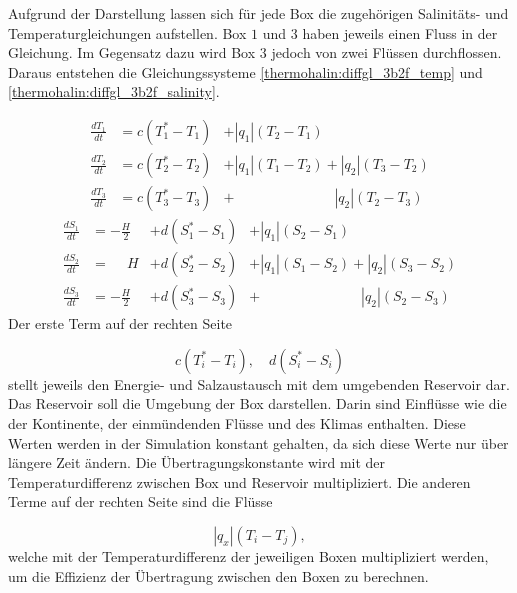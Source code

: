 Aufgrund der Darstellung lassen sich für jede Box die zugehörigen Salinitäts- und Temperaturgleichungen aufstellen. Box $1$ und $3$ haben jeweils einen Fluss in der Gleichung. Im Gegensatz dazu wird Box $3$ jedoch von zwei Flüssen durchflossen. Daraus entstehen die Gleichungssysteme \ref{thermohalin:diffgl_3b2f_temp} und \ref{thermohalin:diffgl_3b2f_salinity}. 

\begin{equation}\label{thermohalin:diffgl_3b2f_temp}
\begin{aligned}
\frac{dT_1}{dt} &= c(T_1^*-T_1)&+|q_1|(T_2-T_1)\phantom{+|q_2|(T_3-T_2)}
\\
\frac{dT_2}{dt} &= c(T_2^*-T_2)&+|q_1|(T_1-T_2)+|q_2|(T_3-T_2)
\\
\frac{dT_3}{dt} &= c(T_3^*-T_3)&+ \phantom{+|q_1|(T_1-T_2)}|q_2|(T_2-T_3)
\end{aligned}
\end{equation}
\begin{equation}\label{thermohalin:diffgl_3b2f_salinity}
\begin{aligned}
\frac{dS_1}{dt} &= -\frac{H}{2} &+ d(S_1^*-S_1)&+|q_1|(S_2-S_1)\phantom{+|q_2|(S_3-S_2)}
\\
\frac{dS_2}{dt} &= \phantom{-}H &+ d(S_2^*-S_2)&+|q_1|(S_1-S_2)+|q_2|(S_3-S_2)	
\\
\frac{dS_3}{dt} &= -\frac{H}{2} &+d(S_3^*-S_3)&+ \phantom{+|q_1|(S_1-S_2)}|q_2|(S_2-S_3)
\end{aligned}
\end{equation}	
Der erste Term auf der rechten Seite

\begin{equation*}
	c(T_i^*-T_i), \quad d(S_i^*-S_i)
\end{equation*}
stellt jeweils den Energie- und Salzaustausch mit dem umgebenden Reservoir dar. Das Reservoir soll die Umgebung der Box darstellen. Darin sind Einflüsse wie die der Kontinente, der einmündenden Flüsse und des Klimas enthalten. Diese Werten werden in der Simulation konstant gehalten, da sich diese Werte nur über längere Zeit ändern. Die Übertragungskonstante wird mit der Temperaturdifferenz zwischen Box und Reservoir multipliziert. Die anderen Terme auf der rechten Seite sind die Flüsse

\begin{equation*}
	|q_x|(T_i-T_j),
\end{equation*}
welche mit der Temperaturdifferenz der jeweiligen Boxen multipliziert werden, um die Effizienz der Übertragung zwischen den Boxen zu berechnen.  


